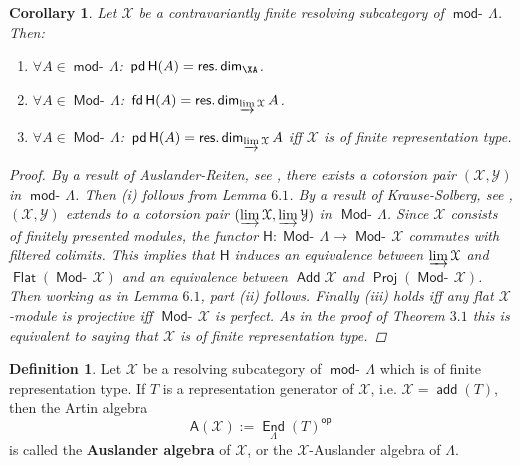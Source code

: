 \documentclass[oneside, a4paper,reqno]{amsart}
\numberwithin{equation}{section}
\newtheorem{cor}[thm]{Corollary}
\theoremstyle{definition}
\newtheorem{defn}[thm]{Definition}
\begin{document}
\begin{cor} Let ${\mathcal X}$ be a contravariantly finite
resolving subcategory of $\operatorname*{\mathsf{mod}-\!}\Lambda$. Then:
\begin{enumerate}
\item $\forall A \in \operatorname*{\mathsf{mod}-\!}\Lambda$:\, $\operatorname{\mathsf{pd}}\mathsf{H}(A) =
\operatorname*{\mathsf{res.dim}}_\XA$.
\item  $\forall A \in \operatorname*{\mathsf{Mod}-\!}\Lambda$:\, $\operatorname*{\mathsf{fd}}\mathsf{H}(A) =
\operatorname*{\mathsf{res.dim}}_{\operatorname*{\varinjlim}{\mathcal X}}A$.
\item $\forall A \in \operatorname*{\mathsf{Mod}-\!}\Lambda$:\, $\operatorname{\mathsf{pd}}\mathsf{H}(A) =
\operatorname*{\mathsf{res.dim}}_{\operatorname*{\varinjlim}{\mathcal X}}A$ iff ${\mathcal X}$ is of finite representation type.
\end{enumerate}
\begin{proof} By a result of Auslander-Reiten, see
\cite{AR:applications}, there exists a cotorsion pair $({\mathcal X},{\mathcal Y})$ in
$\operatorname*{\mathsf{mod}-\!}\Lambda$. Then (i) follows from Lemma $6.1$.  By a result of
Krause-Solberg, see \cite{KS:appl}, $({\mathcal X},{\mathcal Y})$ extends to a cotorsion
pair $(\operatorname*{\varinjlim}{\mathcal X},\operatorname*{\varinjlim}{\mathcal Y})$ in $\operatorname*{\mathsf{Mod}-\!}\Lambda$. Since ${\mathcal X}$ consists of
finitely presented modules, the functor $\mathsf{H} : \operatorname*{\mathsf{Mod}-\!}\Lambda
{\longrightarrow} \operatorname*{\mathsf{Mod}-\!}{\mathcal X}$ commutes with filtered colimits. This implies that
$\mathsf{H}$ induces an equivalence between $\operatorname*{\varinjlim}{\mathcal X}$ and
$\operatorname*{\mathsf{Flat}}(\operatorname*{\mathsf{Mod}-\!}{\mathcal X})$ and an equivalence between $\operatorname*{\mathsf{Add}}{\mathcal X}$ and
$\operatorname*{\mathsf{Proj}}(\operatorname*{\mathsf{Mod}-\!}{\mathcal X})$.  Then working as in Lemma $6.1$, part (ii) follows.
Finally (iii) holds iff any flat ${\mathcal X}$-module is projective iff
$\operatorname*{\mathsf{Mod}-\!}{\mathcal X}$ is perfect. As in the proof of Theorem $3.1$ this is
equivalent to saying that ${\mathcal X}$ is of finite representation type.
\end{proof}
\end{cor}

\begin{defn} Let ${\mathcal X}$ be a resolving
subcategory of $\operatorname*{\mathsf{mod}-\!}\Lambda$ which is of finite representation
type. If $T$ is a representation generator of ${\mathcal X}$, i.e. ${\mathcal X} =
\operatorname*{\mathsf{add}}(T)$,  then the Artin algebra
\[\mathsf{A}({\mathcal X}) := \operatorname*{\mathsf{End}}_{\Lambda}(T)^\operatorname*{\mathsf{op}}\]
 is called the {\bf
Auslander algebra} of ${\mathcal X}$, or the ${\mathcal X}$-Auslander algebra of
$\Lambda$.
\end{defn}
\end{document}
